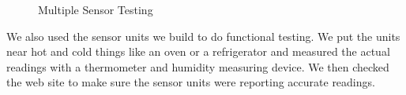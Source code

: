 \documentclass{report}
\begin{document}
\begin{figure}[H]
	\caption{Multiple Sensor Testing}
\end{figure}
\indent
We also used the sensor units we build to do functional testing. We put the units near hot and cold things like an oven or a refrigerator and measured the actual readings with a thermometer and humidity measuring device. We then checked the web site to make sure the sensor units were reporting accurate readings.
\newpage
\end{document}
